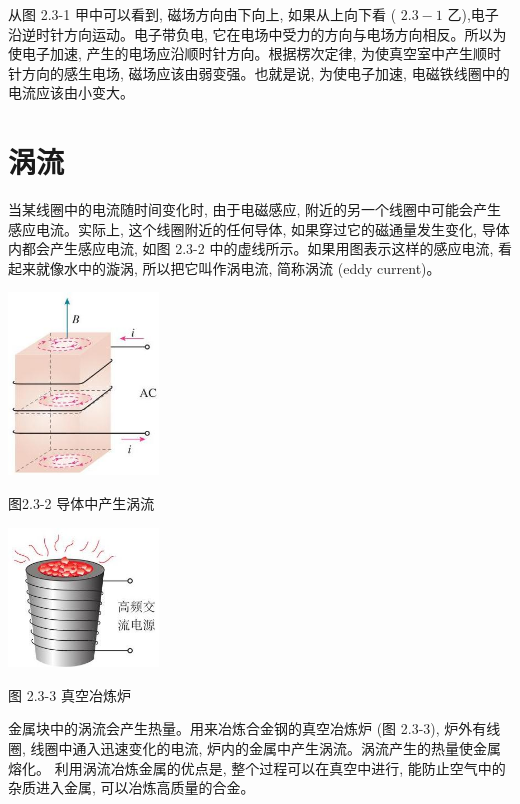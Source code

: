 \documentclass[10pt]{article}
\begin{document}
从图 2.3-1 甲中可以看到, 磁场方向由下向上, 如果从上向下看 ( \({2.3} - 1\) 乙),电子沿逆时针方向运动。电子带负电, 它在电场中受力的方向与电场方向相反。所以为使电子加速, 产生的电场应沿顺时针方向。根据楞次定律, 为使真空室中产生顺时针方向的感生电场, 磁场应该由弱变强。也就是说, 为使电子加速, 电磁铁线圈中的电流应该由小变大。

\section*{涡流}

当某线圈中的电流随时间变化时, 由于电磁感应, 附近的另一个线圈中可能会产生感应电流。实际上, 这个线圈附近的任何导体, 如果穿过它的磁通量发生变化, 导体内都会产生感应电流, 如图 2.3-2 中的虚线所示。如果用图表示这样的感应电流, 看起来就像水中的漩涡, 所以把它叫作涡电流, 简称涡流 (eddy current)。

\begin{center}
\includegraphics[max width=0.3\textwidth]{images/01910e72-c5b7-7ed5-a6d4-fb3a5faefc32_41_829650.jpg}
\end{center}

图2.3-2 导体中产生涡流

\begin{center}
\includegraphics[max width=0.3\textwidth]{images/01910e72-c5b7-7ed5-a6d4-fb3a5faefc32_41_119655.jpg}
\end{center}

图 2.3-3 真空冶炼炉

金属块中的涡流会产生热量。用来冶炼合金钢的真空冶炼炉 (图 2.3-3), 炉外有线圈, 线圈中通入迅速变化的电流, 炉内的金属中产生涡流。涡流产生的热量使金属熔化。 利用涡流冶炼金属的优点是, 整个过程可以在真空中进行, 能防止空气中的杂质进入金属, 可以冶炼高质量的合金。
\end{document}
